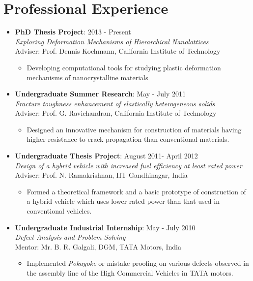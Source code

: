 \documentclass[10pt,fleqn]{article}
\begin{document}
\section*{Professional Experience}
\begin{itemize}

\item[] \textbf{PhD Thesis Project}: \hfill 2013 - Present\\
		\emph{Exploring Deformation Mechanisms of Hierarchical Nanolattices} \\
		 Adviser: Prof. Dennis Kochmann, California Institute of Technology
		  \begin{itemize}
		  \item  Developing computational tools for studying plastic deformation mechanisms of nanocrystalline materials
 		  \end{itemize}
 		  
\item[] \textbf{Undergraduate Summer Research}: \hfill May - July 2011\\
		\emph{Fracture toughness enhancement of elastically heterogeneous solids} \\
		  Adviser: Prof. G. Ravichandran, California Institute of Technology
		   \begin{itemize}
			\item Designed an innovative mechanism for construction of materials having higher resistance to crack propagation than conventional materials.
 			\end{itemize}
 			
\item[] \textbf{Undergraduate Thesis Project}: \hfill August 2011- April 2012\\
		\emph{Design of a hybrid vehicle with increased fuel efficiency at least rated power}\\
		  Adviser: Prof. N. Ramakrishnan, IIT Gandhinagar, India
		   \begin{itemize}
			\item Formed a theoretical framework and a basic prototype of construction of a hybrid vehicle which uses lower rated power than that used in conventional vehicles.
 			\end{itemize} 
 			
\item[] \textbf{Undergraduate Industrial Internship}: \hfill May - July 2010\\
		\emph{Defect Analysis and Problem Solving}\\
		 Mentor: Mr. B. R. Galgali, DGM, TATA Motors, India
		    \begin{itemize}
			\item Implemented \emph{Pokayoke} or mistake proofing on various defects observed in the assembly line of the High Commercial Vehicles in TATA motors.
 			\end{itemize} 			
\end{itemize}
\end{document}
